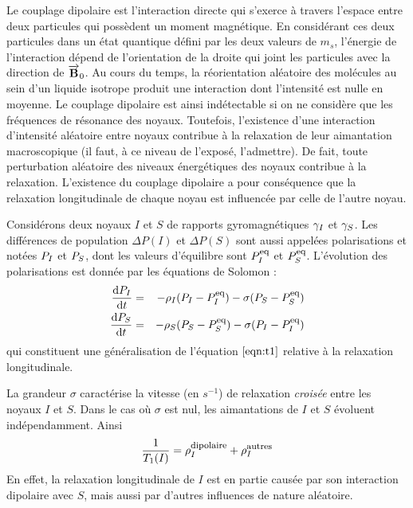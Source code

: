 Le couplage dipolaire est l'interaction directe qui s'exerce à travers
l'espace entre deux particules qui possèdent un moment magnétique.
En considérant ces deux particules dans un état quantique défini par
les deux valeurs de $m_s$, l'énergie de l'interaction dépend de l'orientation
de la droite qui joint les particules avec la direction de $\overrightarrow{\mathbf{B}}_0$.
Au cours du temps, la réorientation aléatoire des molécules
au sein d'un liquide isotrope produit une interaction 
dont l'intensité est nulle en moyenne. 
Le couplage dipolaire est ainsi indétectable si on ne considère que
les fréquences de résonance des noyaux.
Toutefois, l'existence d'une interaction d'intensité aléatoire
entre noyaux contribue à la relaxation de leur aimantation macroscopique
(il faut, à ce niveau de l'exposé, l'admettre).
De fait, toute perturbation aléatoire des niveaux énergétiques des noyaux
contribue à la relaxation.
L'existence du couplage dipolaire a pour conséquence que la relaxation
longitudinale de chaque noyau est influencée par celle de l'autre noyau.

Considérons deux noyaux $I$ et $S$ de rapports gyromagnétiques $\gamma_I$ et $\gamma_S$.
Les différences de population $\Delta P(I)$ et $\Delta P(S)$ sont
aussi appelées polarisations et notées $P_{I}$ et $P_{S}$, dont les
valeurs d'équilibre sont $P_{I}^{\mbox{\footnotesize{eq}}}$ et $P_{S}^{\mbox{\footnotesize{eq}}}$.
L'évolution des polarisations est donnée par les équations de Solomon :
\begin{eqnarray}
\label{eqn:soli}
\frac{\mbox{d}P_{I}}{\mbox{d} t} & = & -\rho_I (P_{I}-P_{I}^{\mbox{\footnotesize{eq}}}) -\sigma (P_{S}-P_{S}^{\mbox{\footnotesize{eq}}}) \\
\label{eqn:sols}
\frac{\mbox{d}P_{S}}{\mbox{d} t} & = & -\rho_S (P_{S}-P_{S}^{\mbox{\footnotesize{eq}}}) -\sigma (P_{I}-P_{I}^{\mbox{\footnotesize{eq}}})
\end{eqnarray}
qui constituent une généralisation de l'équation $\ref{eqn:t1}$
relative à la relaxation longitudinale.

La grandeur $\sigma$ caractérise la vitesse (en $s^{-1}$) de relaxation \emph{croisée}
entre les noyaux $I$ et $S$.
Dans le cas où $\sigma$ est nul, les aimantations de $I$ et $S$ évoluent indépendamment.
Ainsi
\begin{equation}
\frac{1}{T_1(I)} = \rho_I^{\mbox{\footnotesize{dipolaire}}} + \rho_I^{\mbox{\footnotesize{autres}}}
\end{equation}
En effet, la  relaxation longitudinale de $I$ est en partie causée par son interaction
dipolaire avec $S$, mais aussi par d'autres influences de nature aléatoire.


